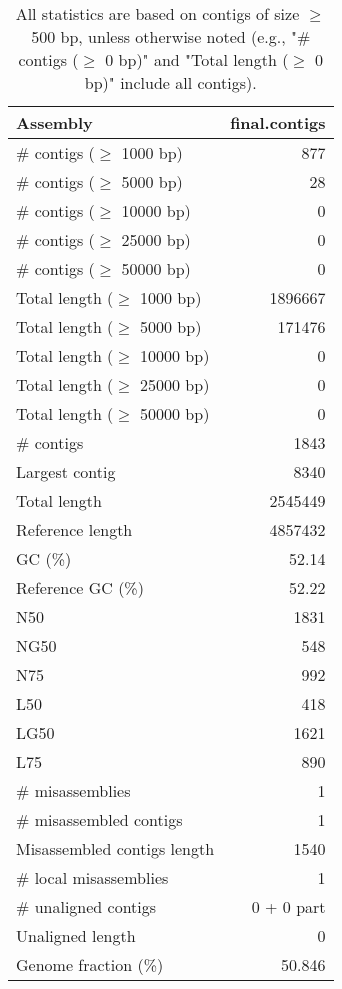 \documentclass[12pt,a4paper]{article}
\begin{document}
\begin{table}[ht]
\begin{center}
\caption{All statistics are based on contigs of size $\geq$ 500 bp, unless otherwise noted (e.g., "\# contigs ($\geq$ 0 bp)" and "Total length ($\geq$ 0 bp)" include all contigs).}
\begin{tabular}{|l*{1}{|r}|}
\hline
Assembly & final.contigs \\ \hline
\# contigs ($\geq$ 1000 bp) & 877 \\ \hline
\# contigs ($\geq$ 5000 bp) & 28 \\ \hline
\# contigs ($\geq$ 10000 bp) & 0 \\ \hline
\# contigs ($\geq$ 25000 bp) & 0 \\ \hline
\# contigs ($\geq$ 50000 bp) & 0 \\ \hline
Total length ($\geq$ 1000 bp) & 1896667 \\ \hline
Total length ($\geq$ 5000 bp) & 171476 \\ \hline
Total length ($\geq$ 10000 bp) & 0 \\ \hline
Total length ($\geq$ 25000 bp) & 0 \\ \hline
Total length ($\geq$ 50000 bp) & 0 \\ \hline
\# contigs & 1843 \\ \hline
Largest contig & 8340 \\ \hline
Total length & 2545449 \\ \hline
Reference length & 4857432 \\ \hline
GC (\%) & 52.14 \\ \hline
Reference GC (\%) & 52.22 \\ \hline
N50 & 1831 \\ \hline
NG50 & 548 \\ \hline
N75 & 992 \\ \hline
L50 & 418 \\ \hline
LG50 & 1621 \\ \hline
L75 & 890 \\ \hline
\# misassemblies & 1 \\ \hline
\# misassembled contigs & 1 \\ \hline
Misassembled contigs length & 1540 \\ \hline
\# local misassemblies & 1 \\ \hline
\# unaligned contigs & 0 + 0 part \\ \hline
Unaligned length & 0 \\ \hline
Genome fraction (\%) & 50.846 \\ \hline

\end{tabular}
\end{center}
\end{table}
\end{document}
